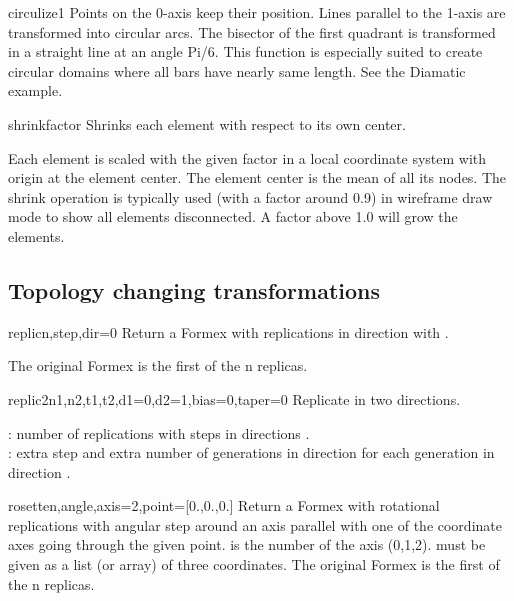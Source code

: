 {{\begin{methoddesc}{circulize1}{}
Points on the 0-axis keep their position. Lines parallel to the 1-axis
are transformed into circular arcs. The bisector of the first quadrant
is transformed in a straight line at an angle Pi/6.
This function is especially suited to create circular domains where
all bars have nearly same length. See the Diamatic example.
\end{methoddesc}

\begin{methoddesc}{shrink}{factor}
Shrinks each element with respect to its own center.

Each element is scaled with the given factor in a local coordinate
system with origin at the element center. The element center is the
mean of all its nodes.
The shrink operation is typically used (with a factor around 0.9) in
wireframe draw mode to show all elements disconnected. A factor above
1.0 will grow the elements.
\end{methoddesc}


\subsection{Topology changing transformations}

\begin{methoddesc}{replic}{n,step,dir=0}
Return a Formex with  replications in direction  with .

The original Formex is the first of the n replicas.
\end{methoddesc}

\begin{methoddesc}{replic2}{n1,n2,t1,t2,d1=0,d2=1,bias=0,taper=0}
Replicate in two directions.

 : number of replications with steps  in directions .\\
 : extra step and extra number of generations in direction  for each generation in direction .
\end{methoddesc}

\begin{methoddesc}{rosette}{n,angle,axis=2,point=[0.,0.,0.]}
Return a Formex with  rotational replications with angular step  around an axis parallel with one of the coordinate axes going through the given point.  is the number of the axis (0,1,2).  must be given as a list (or array) of three coordinates. The original Formex is the first of the n replicas.
\end{methoddesc}

}}
